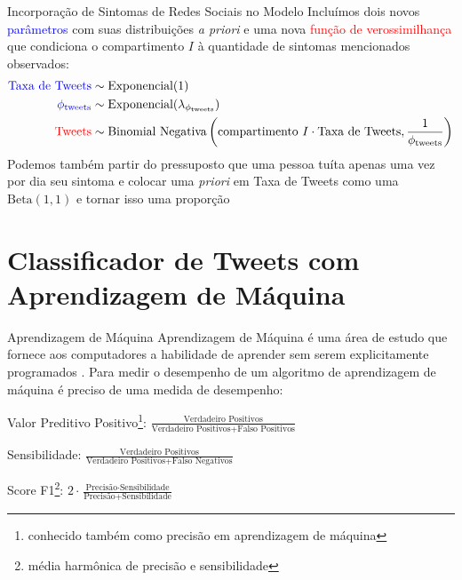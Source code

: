 \documentclass[aspectratio=169]{beamer}                    %
\begin{document}
\begin{frame}{Incorporação de Sintomas de Redes Sociais no Modelo}
    Incluímos dois novos \textcolor{blue}{parâmetros} com suas distribuições \textit{a priori} e uma nova \textcolor{red}{função de verossimilhança} que condiciona o compartimento $I$ à quantidade de sintomas mencionados observados:
    \begin{align*}
        \textcolor{blue}{\text{Taxa de Tweets}} &\sim \text{Exponencial}(1) \\
        \textcolor{blue}{\phi_{\text{tweets}}} &\sim \text{Exponencial}(\lambda_{\phi_{\text{tweets}}}) \\
        \textcolor{red}{\text{Tweets}} &\sim \text{Binomial Negativa}\left(\text{compartimento $I$} \cdot \text{Taxa de Tweets}, \frac{1}{\phi_{\text{tweets}}}\right)
    \end{align*}
    Podemos também partir do pressuposto que uma pessoa tuíta apenas uma vez por dia seu sintoma e colocar uma \textit{priori} em Taxa de Tweets como uma $\text{Beta}(1, 1)$ e tornar isso uma proporção
\end{frame}

\section{Classificador de Tweets com Aprendizagem de Máquina}
\begin{frame}{Aprendizagem de Máquina}
    Aprendizagem de Máquina é uma área de estudo que fornece aos computadores a habilidade de aprender sem serem explicitamente programados \parencite{mitchell1997machine}.
    \vfill
    Para medir o desempenho de um algoritmo de aprendizagem de máquina é preciso de uma medida de desempenho:
    \begin{vfilleditems}
        \item Valor Preditivo Positivo\footnote{conhecido também como precisão em aprendizagem de máquina}: $\frac{\text{Verdadeiro Positivos}}{\text{Verdadeiro Positivos} + \text{Falso Positivos}}$
        \item Sensibilidade: $\frac{\text{Verdadeiro Positivos}}{\text{Verdadeiro Positivos} + \text{Falso Negativos}}$
        \item Score F1\footnote{média harmônica de precisão e sensibilidade}: $2 \cdot \frac{\text{Precisão} \cdot \text{Sensibilidade}}{\text{Precisão} + \text{Sensibilidade}}$
    \end{vfilleditems}
\end{frame}
\end{document}
